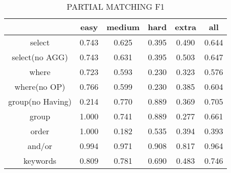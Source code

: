 \begin{table}[h!]
    \centering
    \begin{tabular}{|c|c|c|c|c|c|}
        \hline
                         & easy  & medium & hard  & extra & all   \\ \hline
        select           & 0.743 & 0.625  & 0.395 & 0.490 & 0.644 \\ \hline
        select(no AGG)   & 0.743 & 0.631  & 0.395 & 0.503 & 0.647 \\ \hline
        where            & 0.723 & 0.593  & 0.230 & 0.323 & 0.576 \\ \hline
        where(no OP)     & 0.766 & 0.599  & 0.230 & 0.385 & 0.604 \\ \hline
        group(no Having) & 0.214 & 0.770  & 0.889 & 0.369 & 0.705 \\ \hline
        group            & 1.000 & 0.741  & 0.889 & 0.277 & 0.661 \\ \hline
        order            & 1.000 & 0.182  & 0.535 & 0.394 & 0.393 \\ \hline
        and/or           & 0.994 & 0.971  & 0.908 & 0.817 & 0.964 \\ \hline

        keywords         & 0.809 & 0.781  & 0.690 & 0.483 & 0.746 \\ \hline
    \end{tabular}
    \caption{PARTIAL MATCHING F1 }
\end{table}